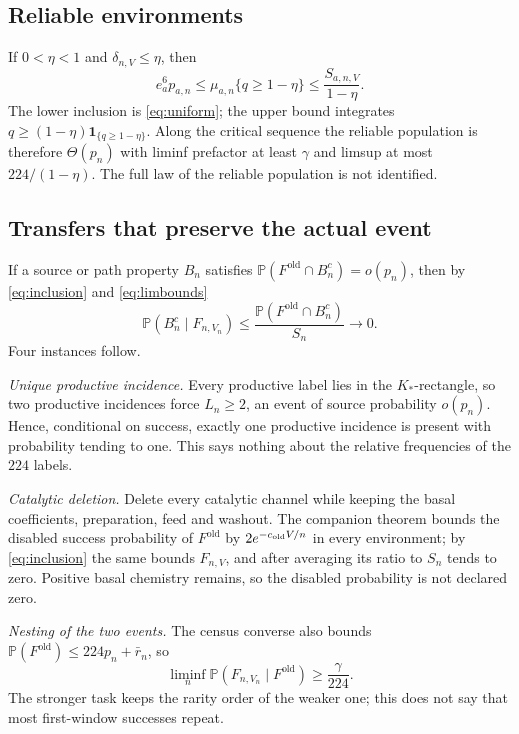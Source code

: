 \documentclass[11pt,letterpaper]{article}
\theoremstyle{plain}
\theoremstyle{definition}
\theoremstyle{remark}
\numberwithin{equation}{section}
\newcommand{\PP}{\mathbb P}
\newcommand{\ind}{\mathbf 1}
\newcommand{\Fold}{F^{\mathrm{old}}}
\begin{document}
\subsection{Reliable environments}
If $0<\eta<1$ and $\delta_{n,V}\le\eta$, then
\begin{equation}\label{eq:reliable}
 e_a^6p_{a,n}\le\mu_{a,n}\{q\ge1-\eta\}\le\frac{S_{a,n,V}}{1-\eta}.
\end{equation}
The lower inclusion is \eqref{eq:uniform}; the upper bound integrates $q\ge(1-\eta)\ind_{\{q\ge1-\eta\}}$. Along the critical sequence the reliable population is therefore $\Theta(p_n)$ with liminf prefactor at least $\gamma$ and limsup at most $224/(1-\eta)$. The full law of the reliable population is not identified.

\subsection{Transfers that preserve the actual event}\label{sec:transfers}
If a source or path property $B_n$ satisfies $\PP(\Fold\cap B_n^c)=o(p_n)$, then by \eqref{eq:inclusion} and \eqref{eq:limbounds}
\begin{equation}\label{eq:transfer}
 \PP(B_n^c\mid F_{n,V_n})\le\frac{\PP(\Fold\cap B_n^c)}{S_n}\to0 .
\end{equation}
Four instances follow.

\emph{Unique productive incidence.} Every productive label lies in the $K_*$-rectangle, so two productive incidences force $L_n\ge2$, an event of source probability $o(p_n)$. Hence, conditional on success, exactly one productive incidence is present with probability tending to one. This says nothing about the relative frequencies of the $224$ labels.

\emph{Catalytic deletion.} Delete every catalytic channel while keeping the basal coefficients, preparation, feed and washout. The companion theorem \cite{structural2026} bounds the disabled success probability of $\Fold$ by $2e^{-c_{\rm old}V/n}$ in every environment; by \eqref{eq:inclusion} the same bounds $F_{n,V}$, and after averaging its ratio to $S_n$ tends to zero. Positive basal chemistry remains, so the disabled probability is not declared zero.

\emph{Nesting of the two events.} The census converse also bounds $\PP(\Fold)\le224p_n+\bar r_n$, so
\begin{equation}\label{eq:nesting}
 \liminf_n\PP(F_{n,V_n}\mid\Fold)\ge\frac\gamma{224}.
\end{equation}
The stronger task keeps the rarity order of the weaker one; this does not say that most first-window successes repeat.
\end{document}
